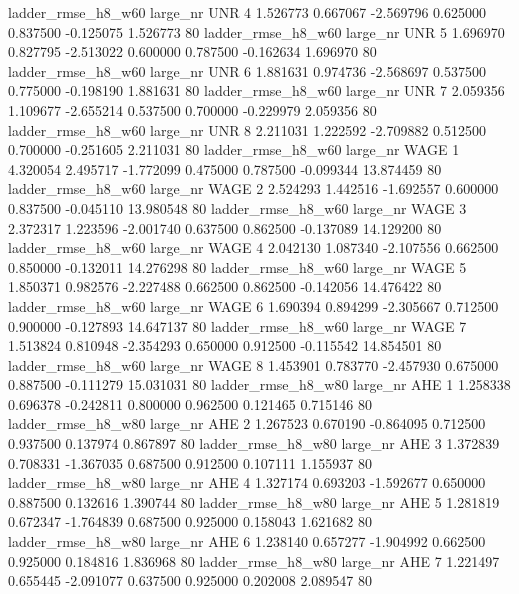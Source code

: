  ladder_rmse_h8_w60   large_nr      UNR                 4  1.526773  0.667067  -2.569796 0.625000 0.837500 -0.125075    1.526773 80
 ladder_rmse_h8_w60   large_nr      UNR                 5  1.696970  0.827795  -2.513022 0.600000 0.787500 -0.162634    1.696970 80
 ladder_rmse_h8_w60   large_nr      UNR                 6  1.881631  0.974736  -2.568697 0.537500 0.775000 -0.198190    1.881631 80
 ladder_rmse_h8_w60   large_nr      UNR                 7  2.059356  1.109677  -2.655214 0.537500 0.700000 -0.229979    2.059356 80
 ladder_rmse_h8_w60   large_nr      UNR                 8  2.211031  1.222592  -2.709882 0.512500 0.700000 -0.251605    2.211031 80
 ladder_rmse_h8_w60   large_nr     WAGE                 1  4.320054  2.495717  -1.772099 0.475000 0.787500 -0.099344   13.874459 80
 ladder_rmse_h8_w60   large_nr     WAGE                 2  2.524293  1.442516  -1.692557 0.600000 0.837500 -0.045110   13.980548 80
 ladder_rmse_h8_w60   large_nr     WAGE                 3  2.372317  1.223596  -2.001740 0.637500 0.862500 -0.137089   14.129200 80
 ladder_rmse_h8_w60   large_nr     WAGE                 4  2.042130  1.087340  -2.107556 0.662500 0.850000 -0.132011   14.276298 80
 ladder_rmse_h8_w60   large_nr     WAGE                 5  1.850371  0.982576  -2.227488 0.662500 0.862500 -0.142056   14.476422 80
 ladder_rmse_h8_w60   large_nr     WAGE                 6  1.690394  0.894299  -2.305667 0.712500 0.900000 -0.127893   14.647137 80
 ladder_rmse_h8_w60   large_nr     WAGE                 7  1.513824  0.810948  -2.354293 0.650000 0.912500 -0.115542   14.854501 80
 ladder_rmse_h8_w60   large_nr     WAGE                 8  1.453901  0.783770  -2.457930 0.675000 0.887500 -0.111279   15.031031 80
 ladder_rmse_h8_w80   large_nr      AHE                 1  1.258338  0.696378  -0.242811 0.800000 0.962500  0.121465    0.715146 80
 ladder_rmse_h8_w80   large_nr      AHE                 2  1.267523  0.670190  -0.864095 0.712500 0.937500  0.137974    0.867897 80
 ladder_rmse_h8_w80   large_nr      AHE                 3  1.372839  0.708331  -1.367035 0.687500 0.912500  0.107111    1.155937 80
 ladder_rmse_h8_w80   large_nr      AHE                 4  1.327174  0.693203  -1.592677 0.650000 0.887500  0.132616    1.390744 80
 ladder_rmse_h8_w80   large_nr      AHE                 5  1.281819  0.672347  -1.764839 0.687500 0.925000  0.158043    1.621682 80
 ladder_rmse_h8_w80   large_nr      AHE                 6  1.238140  0.657277  -1.904992 0.662500 0.925000  0.184816    1.836968 80
 ladder_rmse_h8_w80   large_nr      AHE                 7  1.221497  0.655445  -2.091077 0.637500 0.925000  0.202008    2.089547 80
